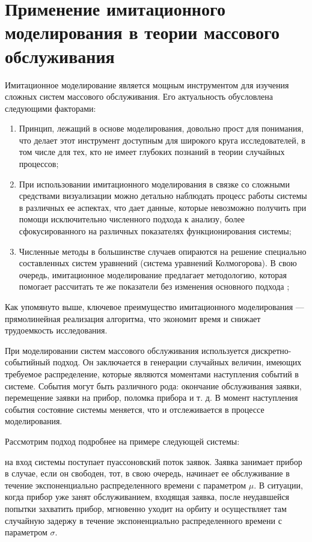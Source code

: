 \section {Применение имитационного моделирования в теории массового обслуживания}
Имитационное моделирование является мощным инструментом для изучения сложных систем массового обслуживания. Его актуальность обусловлена следующими факторами:
\begin{enumerate}
	\item Принцип, лежащий в основе моделирования, довольно прост для понимания, что делает этот инструмент доступным для широкого круга исследователей, в том числе для тех, кто не имеет глубоких познаний в теории случайных процессов;
	\item При использовании имитационного моделирования в связке со сложными средствами визуализации можно детально наблюдать процесс работы системы в различных ее аспектах, что дает данные, которые невозможно получить при помощи исключительно численного подхода к анализу, более сфокусированного на различных показателях функционирования системы; 
	\item Численные методы в большинстве случаев опираются на решение специально составленных систем уравнений (система уравнений Колмогорова). В свою очередь, имитационное моделирование предлагает методологию, которая помогает рассчитать те же показатели без изменения основного подхода \cite{glynn1988simulation};
\end{enumerate}

Как упомянуто выше, ключевое преимущество имитационного моделирования --- прямолинейная реализация алгоритма, что экономит время и снижает трудоемкость исследования.

При моделировании систем массового обслуживания используется дискретно-событийный подход. Он заключается в генерации случайных величин, имеющих требуемое распределение, которые являются моментами наступления событий в системе. События могут быть различного рода: окончание обслуживания заявки, перемещение заявки на прибор, поломка прибора и т. д. В момент наступления события состояние системы меняется, что и отслеживается в процессе моделирования.

Рассмотрим подход подробнее на примере следующей системы:

на вход системы поступает пуассоновский поток заявок. Заявка занимает прибор в случае, если он свободен, тот, в свою очередь, начинает ее обслуживание в течение экспоненциально распределенного времени с параметром $\mu$. В ситуации, когда прибор уже занят обслуживанием, входящая заявка, после неудавшейся попытки захватить прибор, мгновенно уходит на орбиту и осуществляет там случайную задержу в течение экспоненциально распределенного времени с параметром $\sigma$.

